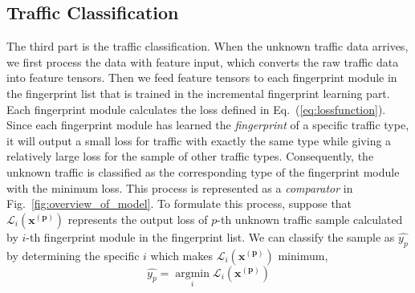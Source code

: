 \subsection{Traffic Classification}
The third part is the traffic classification. 
When the unknown traffic data arrives,  we first process the data with feature input, which converts the raw traffic data into feature tensors. 
Then we feed feature tensors to each fingerprint module in the fingerprint list that is trained in the incremental fingerprint learning part.
Each fingerprint module calculates the loss defined in Eq.~(\ref{eq:lossfunction}).
Since each fingerprint module has learned the \emph{fingerprint} of a specific traffic type, it will output a small loss for traffic with exactly the same type while giving a relatively large loss for the sample of other traffic types. 
Consequently, the unknown traffic is classified as the corresponding type of the fingerprint module with the minimum loss.
This process is represented as a \emph{comparator} in Fig.~\ref{fig:overview_of_model}.
To formulate this process, suppose that $\mathcal{L}_i(\mathbf{x^{(p)}})$ represents the output loss of $p$-th unknown traffic sample calculated by $i$-th fingerprint module in the fingerprint list. We can classify the sample as $\hat{y_p}$ by determining the specific $i$ which makes $\mathcal{L}_i(\mathbf{x^{(p)}})$ minimum,
\begin{equation}\label{eq:argminlabel}
\hat{y_p} = \mathop{\arg\min}\limits_{i}  \mathcal{L}_i(\mathbf{x^{(p)}})
\end{equation}
